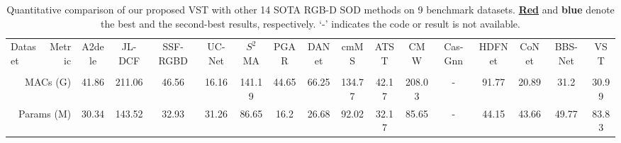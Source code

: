 \documentclass[10pt,twocolumn,letterpaper]{article}
\def\blu#1{\textbf{\color{blue} #1}} \def\red#1{\textbf{\color{red}\underline{#1}}}
\begin{document}
\begin{table*}[t]
  \centering
  \footnotesize
  \renewcommand{\arraystretch}{1.0}
  \renewcommand{\tabcolsep}{0.7mm}
 \caption{Quantitative comparison of our proposed VST with other 14 SOTA RGB-D SOD methods on 9 benchmark datasets. \red{Red} and \blu{blue} denote the best and the second-best results, respectively. `-' indicates the code or result is not available.}
  \begin{tabular}{lr|cccccccccccccc|c}
  \hline

    Dataset
    & Metric
    & A2dele &JL-DCF & SSF-RGBD & UC-Net & $S^2$MA & PGAR & DANet & cmMS & ATST  & CMW & Cas-Gnn & HDFNet & CoNet & BBS-Net & VST\\
    &
    & \cite{piao2020a2dele} &\cite{Fu2020JLDCF} & \cite{zhang2020select}   & \cite{zhang2020ucnet} & \cite{liu2020S2MA} & \cite{chen2020PGAR} & \cite{zhao2020DANet} & \cite{li2020cmMS} & \cite{zhang2020ATSA} &\cite{Li2020CMWNet} & \cite{luo2020Cas-Gnn} & \cite{HDFNet-ECCV2020} & \cite{Wei2020CoNet} & \cite{fan2020bbsnet}\\ \hline

   \multicolumn{2}{r|}{MACs (G)}  &41.86 &211.06 &46.56 &16.16 &141.19	&44.65 &66.25 &134.77 &42.17 &208.03 &-	&91.77 &20.89 &31.2 &30.99\\
   \multicolumn{2}{r|}{Params (M)} &30.34 &143.52 &32.93 &31.26 &86.65	&16.2 &26.68 &92.02 &32.17 &85.65 &- &44.15	&43.66 &49.77 &83.83\\
     \hline
     

\end{tabular}
\end{table*}
\end{document}

